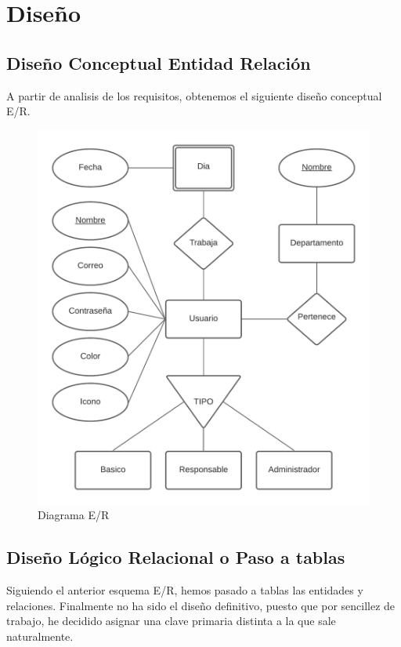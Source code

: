 \documentclass[11pt,spanish,listoffigures,listoftables]{tfgetsinf}
\begin{document}
\chapter{Diseño}

\section{Diseño Conceptual Entidad Relación}
A partir de analisis de los requisitos, obtenemos el siguiente diseño conceptual E/R.

\begin{figure}[h!] %
  \centering
   \includegraphics[scale=0.80]{img/EntidadRelacion.png}
   \caption{Diagrama E/R}
   \label{fig:diagramaer}
 \end{figure}

\section{Diseño Lógico Relacional o Paso a tablas}
Siguiendo el anterior esquema E/R, hemos pasado a tablas las entidades y relaciones.
Finalmente no ha sido el diseño definitivo, puesto que por sencillez de trabajo, he decidido asignar una clave primaria distinta a la que sale naturalmente.
\end{document}

